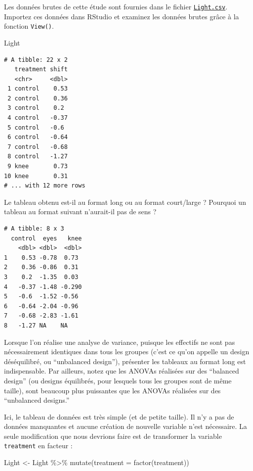 \documentclass[
  a4paper,
]{article}
\newenvironment{Shaded}{\begin{snugshade}}{\end{snugshade}}
\newcommand{\AttributeTok}[1]{\textcolor[rgb]{0.00,0.34,0.68}{#1}}
\newcommand{\FunctionTok}[1]{\textcolor[rgb]{0.39,0.29,0.61}{#1}}
\newcommand{\NormalTok}[1]{\textcolor[rgb]{0.12,0.11,0.11}{#1}}
\newcommand{\OtherTok}[1]{\textcolor[rgb]{0.00,0.43,0.16}{#1}}
\newcommand{\SpecialCharTok}[1]{\textcolor[rgb]{0.24,0.68,0.91}{#1}}
\begin{document}
Les données brutes de cette étude sont fournies dans le fichier \href{https://besibo.github.io/Biometrie3/data/Light.csv}{\texttt{Light.csv}}. Importez ces données dans RStudio et examinez les données brutes grâce à la fonction \texttt{View()}.

\begin{Shaded}
\begin{Highlighting}[]
\NormalTok{Light}
\end{Highlighting}
\end{Shaded}

\begin{verbatim}
# A tibble: 22 x 2
   treatment shift
   <chr>     <dbl>
 1 control    0.53
 2 control    0.36
 3 control    0.2 
 4 control   -0.37
 5 control   -0.6 
 6 control   -0.64
 7 control   -0.68
 8 control   -1.27
 9 knee       0.73
10 knee       0.31
# ... with 12 more rows
\end{verbatim}

Le tableau obtenu est-il au format long ou au format court/large ? Pourquoi un tableau au format suivant n'aurait-il pas de sens ?

\begin{verbatim}
# A tibble: 8 x 3
  control  eyes   knee
    <dbl> <dbl>  <dbl>
1    0.53 -0.78  0.73 
2    0.36 -0.86  0.31 
3    0.2  -1.35  0.03 
4   -0.37 -1.48 -0.290
5   -0.6  -1.52 -0.56 
6   -0.64 -2.04 -0.96 
7   -0.68 -2.83 -1.61 
8   -1.27 NA    NA    
\end{verbatim}

Lorsque l'on réalise une analyse de variance, puisque les effectifs ne sont pas nécessairement identiques dans tous les groupes (c'est ce qu'on appelle un design déséquilibré, ou ``unbalanced design''), présenter les tableaux au format long est indispensable. Par ailleurs, notez que les ANOVAs réalisées sur des ``balanced design'' (ou designs équilibrés, pour lesquels tous les groupes sont de même taille), sont beaucoup plus puissantes que les ANOVAs réalisées sur des ``unbalanced designs.''

Ici, le tableau de données est très simple (et de petite taille). Il n'y a pas de données manquantes et aucune création de nouvelle variable n'est nécessaire. La seule modification que nous devrions faire est de transformer la variable \texttt{treatment} en facteur :

\begin{Shaded}
\begin{Highlighting}[]
\NormalTok{Light }\OtherTok{\textless{}{-}}\NormalTok{ Light }\SpecialCharTok{\%\textgreater{}\%} 
  \FunctionTok{mutate}\NormalTok{(}\AttributeTok{treatment =} \FunctionTok{factor}\NormalTok{(treatment))}
\end{Highlighting}
\end{Shaded}
\end{document}
